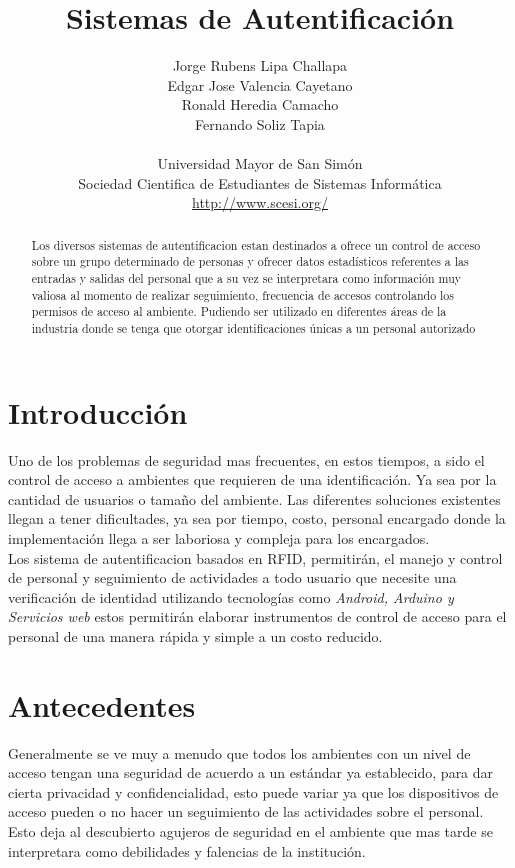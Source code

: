 \documentclass[11pt,twocolumn]{article}
\title{
\vspace{-3cm}   
Sistemas de Autentificaci\'on
}
\author{ 
Jorge Rubens Lipa Challapa\\
Edgar Jose Valencia Cayetano\\
Ronald Heredia Camacho\\
Fernando Soliz Tapia\\
\\
Universidad Mayor de San Sim\'on \\
Sociedad Cientifica de Estudiantes de Sistemas Inform\'atica\\
\url {http://www.scesi.org/}
}
\date{}
\begin{document}
\maketitle

\begin{abstract} 
Los diversos sistemas de autentificacion estan destinados a ofrece un control de acceso sobre un grupo determinado de personas y ofrecer datos estadísticos referentes a las entradas y salidas del personal que a su vez se interpretara como informaci\'on muy valiosa al momento de realizar seguimiento, frecuencia de accesos controlando los permisos de acceso al ambiente.  Pudiendo ser utilizado en diferentes \'areas de la industria donde se tenga que otorgar identificaciones \'unicas a un personal autorizado\\
\end{abstract}

\begin{abstract} 

\end{abstract}


\section{Introducci\'on}
Uno de los problemas de seguridad mas frecuentes, en estos tiempos, a sido el control de acceso a ambientes que requieren de una identificaci\'on. Ya sea por la cantidad de usuarios o tama\~no del ambiente. Las diferentes soluciones existentes llegan a tener dificultades, ya sea por tiempo, costo, personal encargado donde la implementaci\'on llega a ser laboriosa y compleja para los encargados. \\

Los sistema de autentificacion basados en RFID, permitir\'an, el manejo y control de personal y seguimiento de actividades a todo usuario que necesite una verificaci\'on de identidad utilizando tecnolog\'ias como \textit{Android, Arduino y Servicios web} estos permitir\'an elaborar instrumentos de control de acceso para el personal de una manera r\'apida y simple a un costo reducido.\\

\section{Antecedentes}

Generalmente se ve muy a menudo que todos los ambientes  con un nivel de acceso tengan una seguridad de acuerdo a un est\'andar ya establecido, para dar cierta privacidad y confidencialidad, esto puede variar ya que los dispositivos de acceso pueden o no hacer un seguimiento de las actividades sobre el personal. Esto deja al descubierto agujeros de seguridad en el ambiente que mas tarde se interpretara como debilidades y falencias de la instituci\'on.\\
\end{document}
